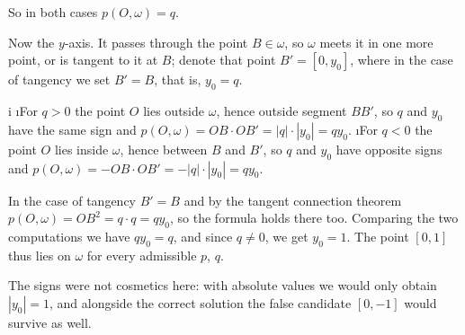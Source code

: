 {    So in both cases $p(O,\omega)=q$.

    Now the $y$-axis. It passes through the point $B \in \omega$, so $\omega$ meets it in one more point, or is tangent to it at $B$; denote that point $B'=[0,y_0]$, where in the case of tangency we set $B'=B$, that is, $y_0=q$.

    \begitems \style i
    \i For $q>0$ the point $O$ lies outside $\omega$, hence outside segment $BB'$, so $q$ and $y_0$ have the same sign and $p(O,\omega)=OB \cdot OB'=|q| \cdot |y_0|=qy_0$.
    \i For $q<0$ the point $O$ lies inside $\omega$, hence between $B$ and $B'$, so $q$ and $y_0$ have opposite signs and $p(O,\omega)=-OB \cdot OB'=-|q| \cdot |y_0|=qy_0$.
    \enditems

    In the case of tangency $B'=B$ and by the tangent connection theorem $p(O,\omega)=OB^2=q \cdot q=qy_0$, so the formula holds there too. Comparing the two computations we have $qy_0=q$, and since $q \neq 0$, we get $y_0=1$. The point $[0,1]$ thus lies on $\omega$ for every admissible $p$, $q$.

    The signs were not cosmetics here: with absolute values we would only obtain $|y_0|=1$, and alongside the correct solution the false candidate $[0,-1]$ would survive as well.
}

